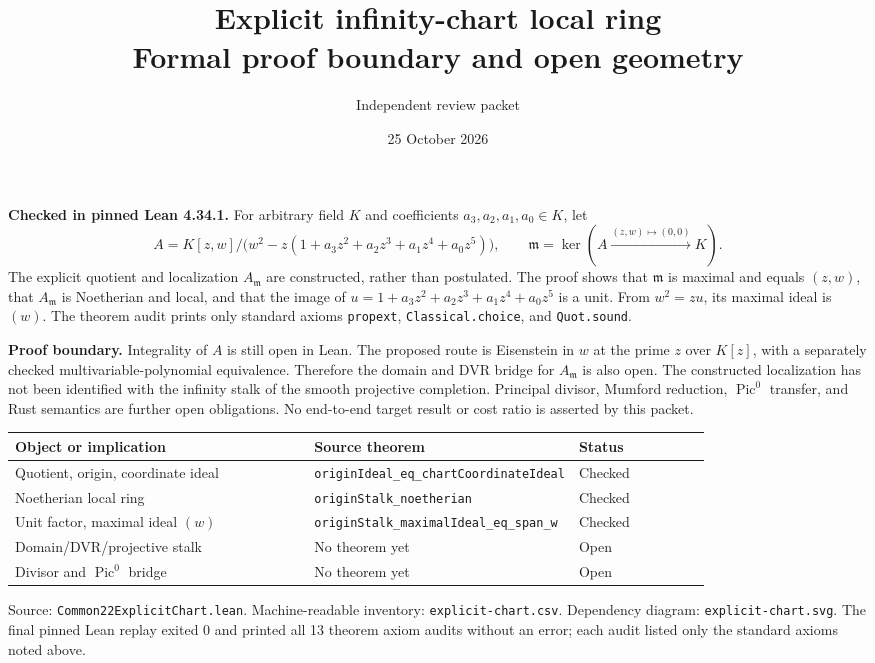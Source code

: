 \documentclass[11pt]{article}
\title{Explicit infinity-chart local ring\\\large Formal proof boundary and open geometry}
\author{Independent review packet}
\date{25 October 2026}
\begin{document}
\maketitle
\noindent\textbf{Checked in pinned Lean 4.34.1.} For arbitrary field $K$ and coefficients $a_3,a_2,a_1,a_0\in K$, let
\[
A=K[z,w]/\bigl(w^2-z(1+a_3z^2+a_2z^3+a_1z^4+a_0z^5)\bigr),
\qquad \mathfrak m=\ker(A\xrightarrow{(z,w)\mapsto(0,0)}K).
\]
The explicit quotient and localization $A_{\mathfrak m}$ are constructed, rather than postulated. The proof shows that $\mathfrak m$ is maximal and equals $(z,w)$, that $A_{\mathfrak m}$ is Noetherian and local, and that the image of $u=1+a_3z^2+a_2z^3+a_1z^4+a_0z^5$ is a unit. From $w^2=zu$, its maximal ideal is $(w)$. The theorem audit prints only standard axioms \texttt{propext}, \texttt{Classical.choice}, and \texttt{Quot.sound}.

\medskip\noindent\textbf{Proof boundary.} Integrality of $A$ is still open in Lean. The proposed route is Eisenstein in $w$ at the prime $z$ over $K[z]$, with a separately checked multivariable-polynomial equivalence. Therefore the domain and DVR bridge for $A_{\mathfrak m}$ is also open. The constructed localization has not been identified with the infinity stalk of the smooth projective completion. Principal divisor, Mumford reduction, $\operatorname{Pic}^0$ transfer, and Rust semantics are further open obligations. No end-to-end target result or cost ratio is asserted by this packet.

\begin{center}
\begin{tabular}{p{0.43\linewidth}p{0.38\linewidth}l}\toprule
Object or implication & Source theorem & Status\\\midrule
Quotient, origin, coordinate ideal & \texttt{originIdeal\_eq\_chartCoordinateIdeal} & Checked\\
Noetherian local ring & \texttt{originStalk\_noetherian} & Checked\\
Unit factor, maximal ideal $(w)$ & \texttt{originStalk\_maximalIdeal\_eq\_span\_w} & Checked\\
Domain/DVR/projective stalk & No theorem yet & Open\\
Divisor and $\operatorname{Pic}^0$ bridge & No theorem yet & Open\\\bottomrule
\end{tabular}
\end{center}
\noindent Source: \texttt{Common22ExplicitChart.lean}. Machine-readable inventory: \texttt{explicit-chart.csv}. Dependency diagram: \texttt{explicit-chart.svg}. The final pinned Lean replay exited 0 and printed all 13 theorem axiom audits without an error; each audit listed only the standard axioms noted above.
\end{document}
